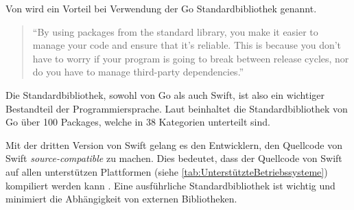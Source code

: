 Von \cite[S.184]{Kennedy.2016} wird ein Vorteil bei Verwendung der Go Standardbibliothek genannt. 

\begin{quote}
\enquote{By using packages from the standard library, you make it easier to manage your code and ensure that it’s reliable. This is because you
don’t have to worry if your program is going to break between release cycles, nor do
you have to manage third-party dependencies.} \cite[S.185]{Kennedy.2016}
\end{quote}

Die Standardbibliothek, sowohl von Go als auch Swift, ist also ein wichtiger Bestandteil der Programmiersprache. 
Laut \cite[S.185]{Kennedy.2016} beinhaltet die Standardbibliothek von Go über 100 Packages, welche in 38 Kategorien unterteilt sind.

Mit der dritten Version von Swift gelang es den Entwicklern, den Quellcode von Swift \textit{source-compatible} zu machen.
Dies bedeutet, dass der Quellcode von Swift auf allen unterstützen Plattformen (siehe \autoref{tab:UnterstützteBetriebssysteme}) kompiliert werden kann \cite[S.8]{Hoffman.2017}.
Eine ausführliche Standardbibliothek ist wichtig und minimiert die Abhängigkeit von externen Bibliotheken.



